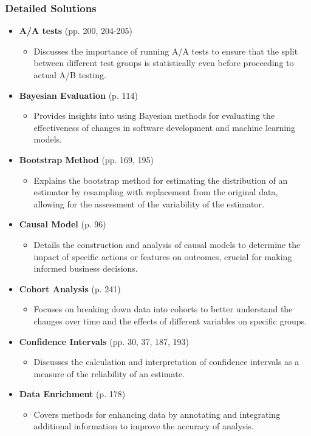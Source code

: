\documentclass{article}
\begin{document}
\subsubsection*{Detailed Solutions}
\begin{itemize}
    \item \textbf{A/A tests} (pp. 200, 204-205)
    \begin{itemize}
        \item Discusses the importance of running A/A tests to ensure that the split between different test groups is statistically even before proceeding to actual A/B testing.
    \end{itemize}

    \item \textbf{Bayesian Evaluation} (p. 114)
    \begin{itemize}
        \item Provides insights into using Bayesian methods for evaluating the effectiveness of changes in software development and machine learning models.
    \end{itemize}

    \item \textbf{Bootstrap Method} (pp. 169, 195)
    \begin{itemize}
        \item Explains the bootstrap method for estimating the distribution of an estimator by resampling with replacement from the original data, allowing for the assessment of the variability of the estimator.
    \end{itemize}

    \item \textbf{Causal Model} (p. 96)
    \begin{itemize}
        \item Details the construction and analysis of causal models to determine the impact of specific actions or features on outcomes, crucial for making informed business decisions.
    \end{itemize}

    \item \textbf{Cohort Analysis} (p. 241)
    \begin{itemize}
        \item Focuses on breaking down data into cohorts to better understand the changes over time and the effects of different variables on specific groups.
    \end{itemize}

    \item \textbf{Confidence Intervals} (pp. 30, 37, 187, 193)
    \begin{itemize}
        \item Discusses the calculation and interpretation of confidence intervals as a measure of the reliability of an estimate.
    \end{itemize}

    \item \textbf{Data Enrichment} (p. 178)
    \begin{itemize}
        \item Covers methods for enhancing data by annotating and integrating additional information to improve the accuracy of analysis.
    \end{itemize}
\end{itemize}
\end{document}
